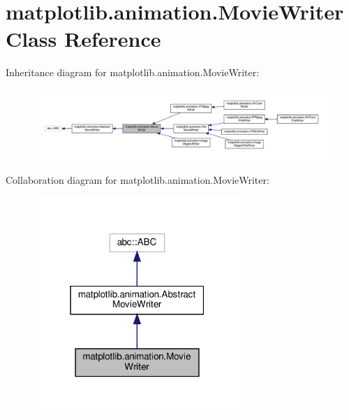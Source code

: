 \hypertarget{classmatplotlib_1_1animation_1_1MovieWriter}{}\section{matplotlib.\+animation.\+Movie\+Writer Class Reference}
\label{classmatplotlib_1_1animation_1_1MovieWriter}


Inheritance diagram for matplotlib.\+animation.\+Movie\+Writer\+:
\nopagebreak
\begin{figure}[H]
\begin{center}
\leavevmode
\includegraphics[width=350pt]{classmatplotlib_1_1animation_1_1MovieWriter__inherit__graph}
\end{center}
\end{figure}


Collaboration diagram for matplotlib.\+animation.\+Movie\+Writer\+:
\nopagebreak
\begin{figure}[H]
\begin{center}
\leavevmode
\includegraphics[width=223pt]{classmatplotlib_1_1animation_1_1MovieWriter__coll__graph}
\end{center}
\end{figure}
